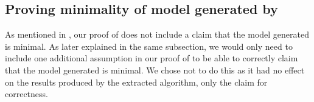 \subsection{Proving minimality of model generated by }

As mentioned in , our proof of  does not include a claim that the model
generated is minimal. As later explained in the same subsection, we would only need to include one additional
assumption in our proof of  to be able to correctly claim that the model generated is minimal.
We chose not to do this as it had no effect on the results produced by the extracted algorithm,
only the claim for correctness.
